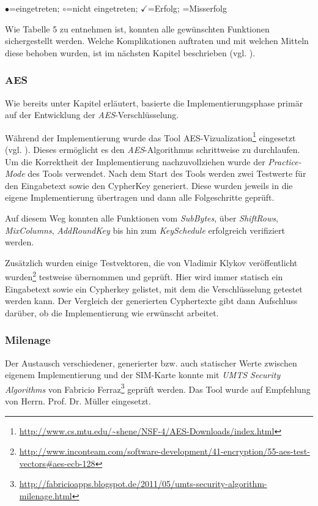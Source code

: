     \centerline{$\bullet$=eingetreten; $\circ$=nicht eingetreten; $\checkmark$=Erfolg; =Misserfolg}\vspace*{5mm}

    Wie Tabelle 5 zu entnehmen ist, konnten alle gewünschten Funktionen sichergestellt werden.
    Welche Komplikationen auftraten und mit welchen Mitteln diese behoben wurden, ist im
    nächsten Kapitel beschrieben (vgl. ).


		\subsubsection[AES (Schenkel)]{AES}
		Wie bereits unter Kapitel  erläutert, basierte die Implementierungsphase
		primär auf der Entwicklung der \textit{AES}-Verschlüsselung. 

		Während der Implementierung wurde das Tool AES-Vizualization\footnote{\url{http://www.cs.mtu.edu/~shene/NSF-4/AES-Downloads/index.html}} eingesetzt (vgl. ).
		Dieses ermöglicht es den \textit{AES}-Algorithmus schrittweise zu durchlaufen.
		Um die Korrektheit der Implementierung nachzuvollziehen wurde der \textit{Practice-Mode}
		des Tools verwendet. Nach dem Start des Tools werden zwei Testwerte für den
		Eingabetext sowie den CypherKey generiert. Diese wurden jeweils in die eigene
		Implementierung übertragen und dann alle Folgeschritte geprüft.

		Auf diesem Weg konnten alle Funktionen vom \textit{SubBytes}, über \textit{ShiftRows},
		\textit{MixColumns}, \textit{AddRoundKey} bis hin zum \textit{KeySchedule} erfolgreich verifiziert
		werden.

		Zusätzlich wurden einige Testvektoren, die von Vladimir Klykov veröffentlicht
		wurden\footnote{\url{http://www.inconteam.com/software-development/41-encryption/55-aes-test-vectors\#aes-ecb-128}}
		testweise übernommen und geprüft. Hier wird immer statisch ein Eingabetext sowie ein
		Cypherkey gelistet, mit dem die Verschlüsselung getestet werden kann. Der Vergleich
		der generierten Cyphertexte gibt dann Aufschluss darüber, ob die Implementierung
		wie erwünscht arbeitet.


		\subsubsection[Milenage (Schenkel)]{Milenage}
		Der Austausch verschiedener, generierter bzw. auch statischer Werte zwischen eigenem
		Implementierung und der SIM-Karte konnte mit \textit{UMTS Security Algorithms}
		von Fabricio Ferraz\footnote{\url{http://fabricioapps.blogspot.de/2011/05/umts-security-algorithm-milenage.html}}
		geprüft werden. Das Tool wurde auf Empfehlung von Herrn. Prof. Dr. Müller eingesetzt.

